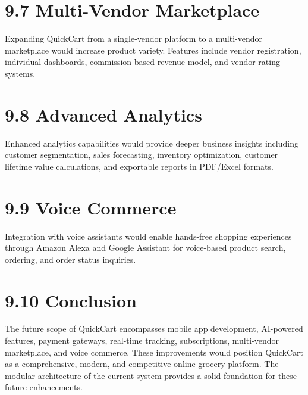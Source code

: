 \documentclass[12pt,a4paper]{report}
\begin{document}
\section*{9.7 Multi-Vendor Marketplace}

Expanding QuickCart from a single-vendor platform to a multi-vendor marketplace would increase product variety. Features include vendor registration, individual dashboards, commission-based revenue model, and vendor rating systems.

\section*{9.8 Advanced Analytics}

Enhanced analytics capabilities would provide deeper business insights including customer segmentation, sales forecasting, inventory optimization, customer lifetime value calculations, and exportable reports in PDF/Excel formats.

\section*{9.9 Voice Commerce}

Integration with voice assistants would enable hands-free shopping experiences through Amazon Alexa and Google Assistant for voice-based product search, ordering, and order status inquiries.

\section*{9.10 Conclusion}

The future scope of QuickCart encompasses mobile app development, AI-powered features, payment gateways, real-time tracking, subscriptions, multi-vendor marketplace, and voice commerce. These improvements would position QuickCart as a comprehensive, modern, and competitive online grocery platform. The modular architecture of the current system provides a solid foundation for these future enhancements.
\end{document}
